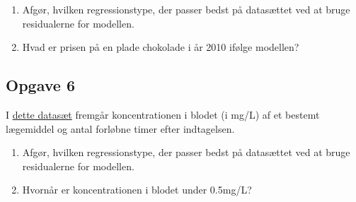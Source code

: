 \begin{enumerate}[label=\roman*)]
	\item Afgør, hvilken regressionstype, der passer bedst på datasættet ved at bruge 
	residualerne for modellen.
	\item Hvad er prisen på en plade chokolade i år 2010 ifølge modellen?
\end{enumerate}

\subsection*{Opgave 6}

I \href{https://github.com/ChristianJLex/TeachingNotes/raw/master/2023-2024/Data og lign/Laegemiddel.xlsx}{\color{blue!60} dette datasæt} fremgår koncentrationen i blodet (i mg/L) af et bestemt lægemiddel og antal forløbne timer efter indtagelsen.

\begin{enumerate}[label=\roman*)]
	\item Afgør, hvilken regressionstype, der passer bedst på datasættet ved at bruge 
	residualerne for modellen.
	\item Hvornår er koncentrationen i blodet under 0.5mg/L?
\end{enumerate}